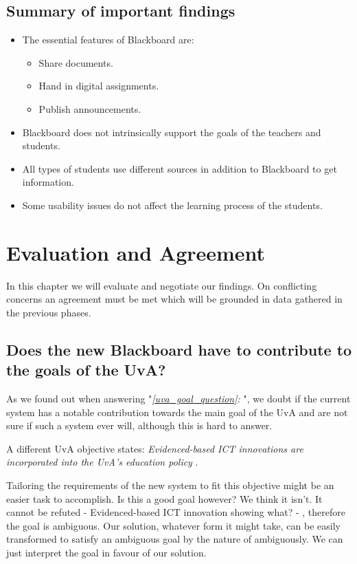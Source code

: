 \section{Summary of important findings}
\begin{itemize}
	\item The essential features of Blackboard are:
	\begin{itemize}
		\item Share documents.
		\item Hand in digital assignments.
		\item Publish announcements.
	\end{itemize}
	\item Blackboard does not intrinsically support the goals of the teachers and students.
	\item All types of students use different sources in addition to Blackboard to get information.
	\item Some usability issues do not affect the learning process of the students.
\end{itemize}


\chapter{Evaluation and Agreement}
In this chapter we will evaluate and negotiate our findings. On conflicting concerns an agreement must be met which will be grounded in data gathered in the previous phases.

\section{Does the new Blackboard have to contribute to the goals of the UvA?}
As we found out when answering "\emph{\ref{uva_goal_question}: }", we doubt if the current system has a notable contribution towards the main goal of the UvA and are not sure if such a system ever will, although this is hard to answer.

A different UvA objective states: \emph{Evidenced-based ICT innovations are	incorporated into the UvA’s education policy} \cite{uva_strategic_plan}.

Tailoring the requirements of the new system to fit this objective might be an easier task to accomplish. Is this a good goal however? We think it isn't. It cannot be refuted - Evidenced-based ICT innovation showing what? - , therefore the goal is ambiguous. Our solution, whatever form it might take, can be easily transformed to satisfy an ambiguous goal by the nature of ambiguously. We can just interpret the goal in favour of our solution.

